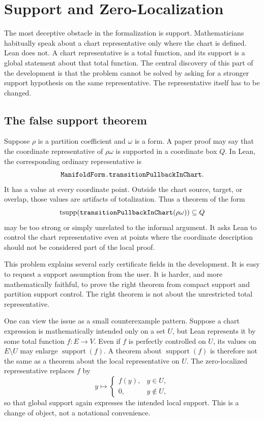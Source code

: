\section{Support and Zero-Localization}
\label{sec:zero-localization}

The most deceptive obstacle in the formalization is support.  Mathematicians
habitually speak about a chart representative only where the chart is defined.
Lean does not.  A chart representative is a total function, and its support is
a global statement about that total function.  The central discovery of this
part of the development is that the problem cannot be solved by asking for a
stronger support hypothesis on the same representative.  The representative
itself has to be changed.

\subsection{The false support theorem}

Suppose \(\rho\) is a partition coefficient and \(\omega\) is a form.  A paper
proof may say that the coordinate representative of \(\rho\omega\) is
supported in a coordinate box \(Q\).  In Lean, the corresponding ordinary
representative is
\[
\code{ManifoldForm.transitionPullbackInChart}.
\]
It has a value at every coordinate point.  Outside the chart source, target, or
overlap, those values are artifacts of totalization.  Thus a theorem of the
form
\[
\tsupp(\code{transitionPullbackInChart}(\rho\omega)) \subseteq Q
\]
may be too strong or simply unrelated to the informal argument.  It asks Lean
to control the chart representative even at points where the coordinate
description should not be considered part of the local proof.

This problem explains several early certificate fields in the development.  It
is easy to request a support assumption from the user.  It is harder, and more
mathematically faithful, to prove the right theorem from compact support and
partition support control.  The right theorem is not about the unrestricted
total representative.

One can view the issue as a small counterexample pattern.  Suppose a chart
expression is mathematically intended only on a set \(U\), but Lean represents
it by some total function \(f : E \to V\).  Even if \(f\) is perfectly
controlled on \(U\), its values on \(E\setminus U\) may enlarge
\(\operatorname{support}(f)\).  A theorem about \(\operatorname{support}(f)\)
is therefore not the same as a theorem about the local representative on
\(U\).  The zero-localized representative replaces \(f\) by
\[
  y\mapsto
  \begin{cases}
    f(y), & y\in U,\\
    0, & y\notin U,
  \end{cases}
\]
so that global support again expresses the intended local support.  This is a
change of object, not a notational convenience.

